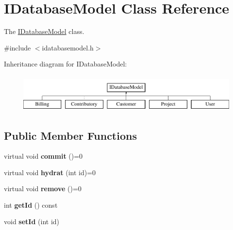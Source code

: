 \hypertarget{classIDatabaseModel}{\section{I\-Database\-Model Class Reference}
\label{classIDatabaseModel}
}


The \hyperlink{classIDatabaseModel}{I\-Database\-Model} class.  




{\ttfamily \#include $<$idatabasemodel.\-h$>$}

Inheritance diagram for I\-Database\-Model\-:\begin{figure}[H]
\begin{center}
\leavevmode
\includegraphics[height=2.000000cm]{d1/dc3/classIDatabaseModel}
\end{center}
\end{figure}
\subsection*{Public Member Functions}
\begin{DoxyCompactItemize}
\item 
\hypertarget{classIDatabaseModel_a2d4fd70557c1815d100df17ba0751cbd}{virtual void {\bfseries commit} ()=0}\label{classIDatabaseModel_a2d4fd70557c1815d100df17ba0751cbd}

\item 
\hypertarget{classIDatabaseModel_a25e44ed10a75976f86e14d34aea02c37}{virtual void {\bfseries hydrat} (int id)=0}\label{classIDatabaseModel_a25e44ed10a75976f86e14d34aea02c37}

\item 
\hypertarget{classIDatabaseModel_a11d94697daf0af2b44fbe37ef831ea94}{virtual void {\bfseries remove} ()=0}\label{classIDatabaseModel_a11d94697daf0af2b44fbe37ef831ea94}

\item 
\hypertarget{classIDatabaseModel_a61523b015ec148d4e68ee8054c2ad3e3}{int {\bfseries get\-Id} () const }\label{classIDatabaseModel_a61523b015ec148d4e68ee8054c2ad3e3}

\item 
\hypertarget{classIDatabaseModel_ad4f47f3e25302c506ce98103e616ca57}{void {\bfseries set\-Id} (int id)}\label{classIDatabaseModel_ad4f47f3e25302c506ce98103e616ca57}

\end{DoxyCompactItemize}
